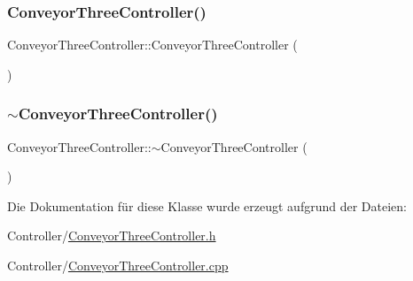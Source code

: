 \subsubsection{\texorpdfstring{Conveyor\+Three\+Controller()}{ConveyorThreeController()}}
{\footnotesize\ttfamily Conveyor\+Three\+Controller\+::\+Conveyor\+Three\+Controller (\begin{DoxyParamCaption}{ }\end{DoxyParamCaption})}

\hypertarget{class_conveyor_three_controller_a3ea9a30cb49da76384b3633d11240c92}{}\label{class_conveyor_three_controller_a3ea9a30cb49da76384b3633d11240c92} 
\subsubsection{\texorpdfstring{$\sim$\+Conveyor\+Three\+Controller()}{~ConveyorThreeController()}}
{\footnotesize\ttfamily Conveyor\+Three\+Controller\+::$\sim$\+Conveyor\+Three\+Controller (\begin{DoxyParamCaption}{ }\end{DoxyParamCaption})\hspace{0.3cm}{\ttfamily [virtual]}}



Die Dokumentation für diese Klasse wurde erzeugt aufgrund der Dateien\+:\begin{DoxyCompactItemize}
\item 
Controller/\hyperlink{_conveyor_three_controller_8h}{Conveyor\+Three\+Controller.\+h}\item 
Controller/\hyperlink{_conveyor_three_controller_8cpp}{Conveyor\+Three\+Controller.\+cpp}\end{DoxyCompactItemize}
